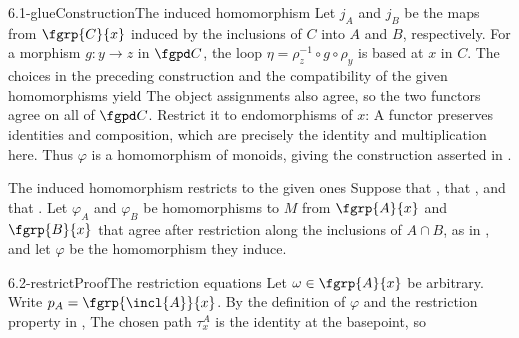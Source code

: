 \begin{proofpassage}{6.1-glue}{Construction}{The induced homomorphism}
Let $j_A$ and $j_B$ be the maps from $\fgrp{C}{x}$ induced by the
inclusions of $C$ into $A$ and $B$, respectively.
For a morphism $g:y\longrightarrow z$ in $\fgpd C$, the loop
$\eta=\rho_z^{-1}\circ g\circ\rho_y$ is based at $x$ in $C$.
The choices in the preceding construction and the compatibility of the
given homomorphisms yield
The object assignments also agree, so the two functors agree on all of
$\fgpd C$.    Restrict it to endomorphisms of $x$:
A functor preserves identities and composition, which are precisely the
identity and multiplication here.  Thus $\varphi$ is a homomorphism of
monoids, giving the construction asserted in .
\end{proofpassage}

\begin{proposition}[id=6.2]{The induced homomorphism restricts to the given ones}
Suppose that \hypCoverTwo, that \hypPathConnected, and that \hypBasepoint.  Let
$\varphi_{A}$ and $\varphi_{B}$ be homomorphisms to $M$ from $\fgrp{A}{x}$ and
$\fgrp{B}{x}$ that agree after restriction along the inclusions of $A \cap B$,
as in , and let $\varphi$ be the homomorphism they induce.
\end{proposition}

\begin{proofpassage}{6.2-restrict}{Proof}{The restriction equations}
Let $\omega\in\fgrp{A}{x}$ be arbitrary.  Write $p_A=\fgrp{\incl{A}}{x}$.
By the definition of $\varphi$ and the restriction property in
,
The chosen path $\tau^A_x$ is the identity at the basepoint, so
\end{proofpassage}

